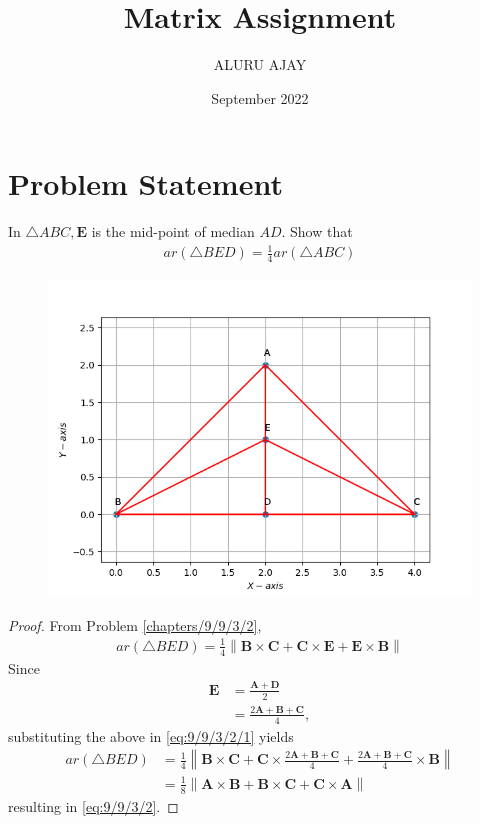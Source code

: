 \documentclass[journal,10pt,twocolumn]{article}
\title{\textbf{Matrix Assignment}}
\author{ALURU AJAY}
\date{September 2022}
\providecommand{\norm}[1]{\left\lVert#1\right\rVert}
\let\vec\mathbf
\begin{document}
\maketitle

\section{Problem Statement}
\fi
In $\triangle ABC, \vec{E}$ is the mid-point of median $AD$.
Show that 
\begin{align}
ar(\triangle BED) = \frac{1}{4} ar(\triangle ABC)
		\label{eq:9/9/3/2}
\end{align}
	\begin{figure}[!h]
		\centering
 \includegraphics[width=\columnwidth]{chapters/9/9/3/2/figs/fig_Triangle.png}
		\caption{}
		\label{fig:9/9/3/2}
  	\end{figure}
\begin{proof}
	From Problem 
\ref{chapters/9/9/3/2},
  \begin{align}
ar(\triangle BED) =
 \frac{1}{4}\norm{\vec{B} \times \vec{C}+\vec{C} \times \vec{E}+\vec{E} \times \vec{B}}
		\label{eq:9/9/3/2/1}
  \end{align}
  Since 
  \begin{align}
	  \vec{E} &= \frac{ \vec{A}+\vec{D}}{2}
	  \\
	  &= \frac{ 2\vec{A}+\vec{B} + \vec{C}}{4},
  \end{align}
  substituting the above in 
		\eqref{eq:9/9/3/2/1}
		yields
  \begin{align}
	  ar(\triangle BED) &=
 \frac{1}{4}\norm{\vec{B} \times \vec{C}+\vec{C} \times \frac{ 2\vec{A}+\vec{B} + \vec{C}}{4}+\frac{ 2\vec{A}+\vec{B} + \vec{C}}{4} \times \vec{B}}
 \\
	  &=\frac{1}{8}\norm{\vec{A} \times \vec{B}+\vec{B} \times \vec{C}+\vec{C} \times \vec{A}}
  \end{align}
  resulting in
		\eqref{eq:9/9/3/2}.
\end{proof}
\iffalse
\end{document}
